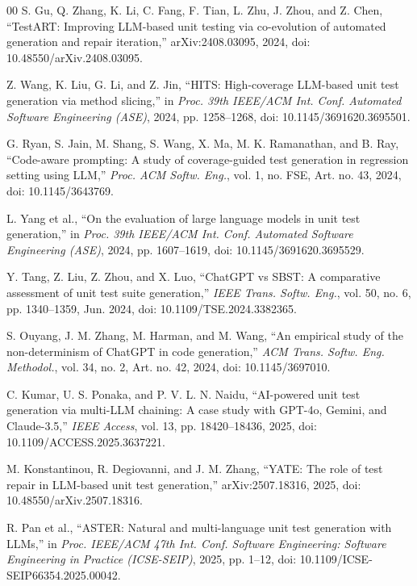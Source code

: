 \begin{thebibliography}{00}
S. Gu, Q. Zhang, K. Li, C. Fang, F. Tian, L. Zhu, J. Zhou, and Z. Chen, ``TestART: Improving LLM-based unit testing via co-evolution of automated generation and repair iteration,'' arXiv:2408.03095, 2024, doi: 10.48550/arXiv.2408.03095.

Z. Wang, K. Liu, G. Li, and Z. Jin, ``HITS: High-coverage LLM-based unit test generation via method slicing,'' in \emph{Proc. 39th IEEE/ACM Int. Conf. Automated Software Engineering (ASE)}, 2024, pp. 1258--1268, doi: 10.1145/3691620.3695501.

G. Ryan, S. Jain, M. Shang, S. Wang, X. Ma, M. K. Ramanathan, and B. Ray, ``Code-aware prompting: A study of coverage-guided test generation in regression setting using LLM,'' \emph{Proc. ACM Softw. Eng.}, vol. 1, no. FSE, Art. no. 43, 2024, doi: 10.1145/3643769.

L. Yang et al., ``On the evaluation of large language models in unit test generation,'' in \emph{Proc. 39th IEEE/ACM Int. Conf. Automated Software Engineering (ASE)}, 2024, pp. 1607--1619, doi: 10.1145/3691620.3695529.

Y. Tang, Z. Liu, Z. Zhou, and X. Luo, ``ChatGPT vs SBST: A comparative assessment of unit test suite generation,'' \emph{IEEE Trans. Softw. Eng.}, vol. 50, no. 6, pp. 1340--1359, Jun. 2024, doi: 10.1109/TSE.2024.3382365.

S. Ouyang, J. M. Zhang, M. Harman, and M. Wang, ``An empirical study of the non-determinism of ChatGPT in code generation,'' \emph{ACM Trans. Softw. Eng. Methodol.}, vol. 34, no. 2, Art. no. 42, 2024, doi: 10.1145/3697010.

C. Kumar, U. S. Ponaka, and P. V. L. N. Naidu, ``AI-powered unit test generation via multi-LLM chaining: A case study with GPT-4o, Gemini, and Claude-3.5,'' \emph{IEEE Access}, vol. 13, pp. 18420--18436, 2025, doi: 10.1109/ACCESS.2025.3637221.

M. Konstantinou, R. Degiovanni, and J. M. Zhang, ``YATE: The role of test repair in LLM-based unit test generation,'' arXiv:2507.18316, 2025, doi: 10.48550/arXiv.2507.18316.

R. Pan et al., ``ASTER: Natural and multi-language unit test generation with LLMs,'' in \emph{Proc. IEEE/ACM 47th Int. Conf. Software Engineering: Software Engineering in Practice (ICSE-SEIP)}, 2025, pp. 1--12, doi: 10.1109/ICSE-SEIP66354.2025.00042.


\end{thebibliography}
